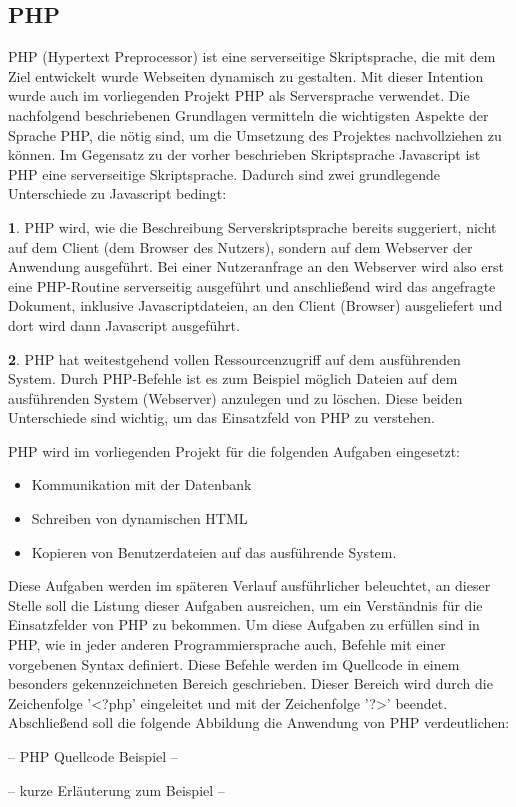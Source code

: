 \subsection{PHP}
\label{sec:Php}

PHP (Hypertext Preprocessor) ist eine serverseitige Skriptsprache, die mit dem Ziel entwickelt wurde Webseiten dynamisch
zu gestalten.
Mit dieser Intention wurde auch im vorliegenden Projekt PHP als Serversprache verwendet. Die nachfolgend beschriebenen
Grundlagen vermitteln die wichtigsten Aspekte der Sprache PHP, die nötig sind, um die Umsetzung des Projektes
nachvollziehen zu können.
Im Gegensatz zu der vorher beschrieben Skriptsprache Javascript ist PHP eine serverseitige Skriptsprache. Dadurch sind
zwei grundlegende Unterschiede zu Javascript bedingt:

\textbf{1}. PHP wird, wie die Beschreibung Serverskriptsprache bereits suggeriert, nicht auf dem Client (dem Browser des Nutzers),
sondern auf dem Webserver der Anwendung ausgeführt. Bei einer Nutzeranfrage an den Webserver wird also erst eine PHP-Routine serverseitig ausgeführt und anschließend wird das angefragte Dokument, inklusive
Javascriptdateien, an den Client (Browser) ausgeliefert und dort wird dann Javascript ausgeführt.

\textbf{2}. PHP hat weitestgehend vollen Ressourcenzugriff auf dem ausführenden System. Durch PHP-Befehle ist es zum Beispiel möglich Dateien auf dem ausführenden System (Webserver) anzulegen und zu löschen.
Diese beiden Unterschiede sind wichtig, um das Einsatzfeld von PHP zu verstehen.

PHP wird im vorliegenden Projekt für die folgenden Aufgaben eingesetzt:
\begin{itemize}
  \item Kommunikation mit der Datenbank
  \item Schreiben von dynamischen HTML
  \item Kopieren von Benutzerdateien auf das ausführende System.
\end{itemize}

Diese Aufgaben werden im späteren Verlauf ausführlicher beleuchtet, an dieser Stelle soll die Listung dieser Aufgaben
ausreichen, um ein Verständnis für die Einsatzfelder von PHP zu bekommen.
Um diese Aufgaben zu erfüllen sind in PHP, wie in jeder anderen Programmiersprache auch, Befehle mit einer vorgebenen
Syntax definiert. Diese Befehle werden im Quellcode in einem besonders gekennzeichneten Bereich geschrieben. Dieser
Bereich wird durch die Zeichenfolge '<?php' eingeleitet und mit der Zeichenfolge '?>' beendet.
Abschließend soll die folgende Abbildung die Anwendung von PHP verdeutlichen:

-- PHP Quellcode Beispiel --

-- kurze Erläuterung zum Beispiel --
